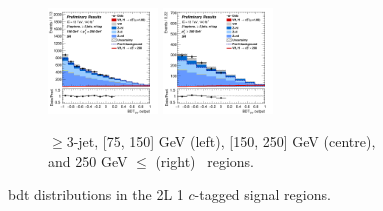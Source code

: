 \begin{figure}[h!]
\begin{subfigure}[b]{\textwidth}
        \includegraphics[width=0.32\textwidth]{Images/VH/Own_fit/postfit_VHcc/Region_distmva_BMax250_BMin150_DSR_J3_TTypent_incJet1_T1_L2_Y6051_GlobalFit_conditionnal_mu1.png}
        \includegraphics[width=0.32\textwidth]{Images/VH/Own_fit/postfit_VHcc/Region_distmva_BMin250_DSR_J3_TTypent_incJet1_T1_L2_Y6051_GlobalFit_conditionnal_mu1.png}
        \caption{$\geq$3-jet, [75, 150] GeV (left), [150, 250] GeV (centre), and 250  GeV $\leq$ (right) \ptv\ regions.}
        \label{fig:plots_VHcc_2L_SR_1c_3J}
    \end{subfigure}
    \caption{\gls{bdt} distributions in the 2L 1 $c$-tagged signal regions.}
    \label{fig:plots_VHcc_2L_SR_1c}
\end{figure}

\newpage
\vspace*{\fill} 



